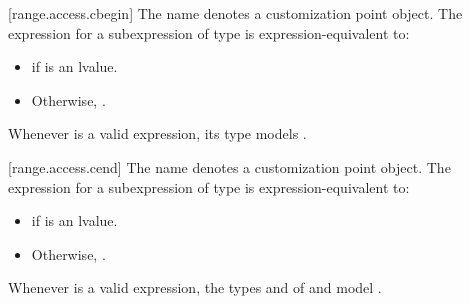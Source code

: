 [range.access.cbegin]{}
\pnum
The name  denotes a customization point
object. The expression
 for a subexpression  of type 
is expression-equivalent to:
\begin{itemize}
\item {} if  is an lvalue.
\item Otherwise, .
\end{itemize}

\pnum
\begin{note}
Whenever  is a valid expression, its type models
.
\end{note}

[range.access.cend]{}
\pnum
The name  denotes a customization point
object. The expression
 for a subexpression  of type 
is expression-equivalent to:
\begin{itemize}
\item {} if  is an lvalue.
\item Otherwise, .
\end{itemize}

\pnum
\begin{note}
Whenever  is a valid expression,
the types  and  of
 and 
model .
\end{note}

